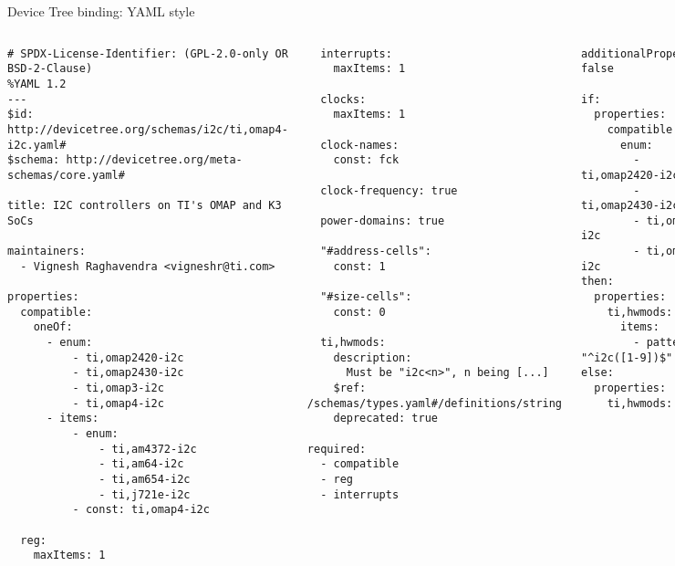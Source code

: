 \begin{frame}[fragile]{Device Tree binding: YAML style}
  \begin{columns}[t]
    \begin{block}{}
      {\fontsize{5}{6}\selectfont
\begin{verbatim}
# SPDX-License-Identifier: (GPL-2.0-only OR BSD-2-Clause)
%YAML 1.2
---
$id: http://devicetree.org/schemas/i2c/ti,omap4-i2c.yaml#
$schema: http://devicetree.org/meta-schemas/core.yaml#

title: I2C controllers on TI's OMAP and K3 SoCs

maintainers:
  - Vignesh Raghavendra <vigneshr@ti.com>

properties:
  compatible:
    oneOf:
      - enum:
          - ti,omap2420-i2c
          - ti,omap2430-i2c
          - ti,omap3-i2c
          - ti,omap4-i2c
      - items:
          - enum:
              - ti,am4372-i2c
              - ti,am64-i2c
              - ti,am654-i2c
              - ti,j721e-i2c
          - const: ti,omap4-i2c

  reg:
    maxItems: 1
\end{verbatim}
      }
    \end{block}
    \begin{block}{}
      {\fontsize{5}{6}\selectfont
\begin{verbatim}
  interrupts:
    maxItems: 1

  clocks:
    maxItems: 1

  clock-names:
    const: fck

  clock-frequency: true

  power-domains: true

  "#address-cells":
    const: 1

  "#size-cells":
    const: 0

  ti,hwmods:
    description:
      Must be "i2c<n>", n being [...]
    $ref: /schemas/types.yaml#/definitions/string
    deprecated: true

required:
  - compatible
  - reg
  - interrupts
\end{verbatim}
      }
    \end{block}
    \begin{block}{}
      {\fontsize{5}{6}\selectfont
\begin{verbatim}
additionalProperties: false

if:
  properties:
    compatible:
      enum:
        - ti,omap2420-i2c
        - ti,omap2430-i2c
        - ti,omap3-i2c
        - ti,omap4-i2c
then:
  properties:
    ti,hwmods:
      items:
        - pattern: "^i2c([1-9])$"
else:
  properties:
    ti,hwmods: false


\end{verbatim}}
\end{block}
\end{columns}
\end{frame}
